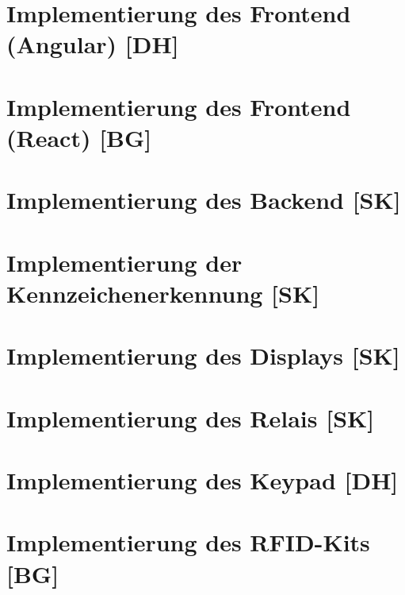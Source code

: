 \section{Implementierung des Frontend (Angular) [DH]}

\section{Implementierung des Frontend (React) [BG]}

\section{Implementierung des Backend [SK]}

\section{Implementierung der Kennzeichenerkennung [SK]}

\section{Implementierung des Displays [SK]}

\section{Implementierung des Relais [SK]}

\newpage
\section{Implementierung des Keypad [DH]}

\section{Implementierung des RFID-Kits [BG]}
